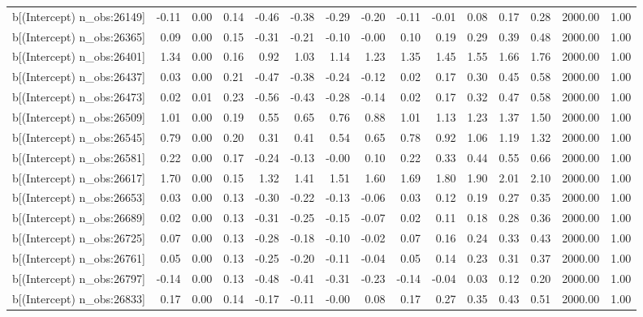 \begin{table}[ht]
\begin{tabular}{rrrrrrrrrrrrrrr}
  b[(Intercept) n\_obs:26149] & -0.11 & 0.00 & 0.14 & -0.46 & -0.38 & -0.29 & -0.20 & -0.11 & -0.01 & 0.08 & 0.17 & 0.28 & 2000.00 & 1.00 \\ 
  b[(Intercept) n\_obs:26365] & 0.09 & 0.00 & 0.15 & -0.31 & -0.21 & -0.10 & -0.00 & 0.10 & 0.19 & 0.29 & 0.39 & 0.48 & 2000.00 & 1.00 \\ 
  b[(Intercept) n\_obs:26401] & 1.34 & 0.00 & 0.16 & 0.92 & 1.03 & 1.14 & 1.23 & 1.35 & 1.45 & 1.55 & 1.66 & 1.76 & 2000.00 & 1.00 \\ 
  b[(Intercept) n\_obs:26437] & 0.03 & 0.00 & 0.21 & -0.47 & -0.38 & -0.24 & -0.12 & 0.02 & 0.17 & 0.30 & 0.45 & 0.58 & 2000.00 & 1.00 \\ 
  b[(Intercept) n\_obs:26473] & 0.02 & 0.01 & 0.23 & -0.56 & -0.43 & -0.28 & -0.14 & 0.02 & 0.17 & 0.32 & 0.47 & 0.58 & 2000.00 & 1.00 \\ 
  b[(Intercept) n\_obs:26509] & 1.01 & 0.00 & 0.19 & 0.55 & 0.65 & 0.76 & 0.88 & 1.01 & 1.13 & 1.23 & 1.37 & 1.50 & 2000.00 & 1.00 \\ 
  b[(Intercept) n\_obs:26545] & 0.79 & 0.00 & 0.20 & 0.31 & 0.41 & 0.54 & 0.65 & 0.78 & 0.92 & 1.06 & 1.19 & 1.32 & 2000.00 & 1.00 \\ 
  b[(Intercept) n\_obs:26581] & 0.22 & 0.00 & 0.17 & -0.24 & -0.13 & -0.00 & 0.10 & 0.22 & 0.33 & 0.44 & 0.55 & 0.66 & 2000.00 & 1.00 \\ 
  b[(Intercept) n\_obs:26617] & 1.70 & 0.00 & 0.15 & 1.32 & 1.41 & 1.51 & 1.60 & 1.69 & 1.80 & 1.90 & 2.01 & 2.10 & 2000.00 & 1.00 \\ 
  b[(Intercept) n\_obs:26653] & 0.03 & 0.00 & 0.13 & -0.30 & -0.22 & -0.13 & -0.06 & 0.03 & 0.12 & 0.19 & 0.27 & 0.35 & 2000.00 & 1.00 \\ 
  b[(Intercept) n\_obs:26689] & 0.02 & 0.00 & 0.13 & -0.31 & -0.25 & -0.15 & -0.07 & 0.02 & 0.11 & 0.18 & 0.28 & 0.36 & 2000.00 & 1.00 \\ 
  b[(Intercept) n\_obs:26725] & 0.07 & 0.00 & 0.13 & -0.28 & -0.18 & -0.10 & -0.02 & 0.07 & 0.16 & 0.24 & 0.33 & 0.43 & 2000.00 & 1.00 \\ 
  b[(Intercept) n\_obs:26761] & 0.05 & 0.00 & 0.13 & -0.25 & -0.20 & -0.11 & -0.04 & 0.05 & 0.14 & 0.23 & 0.31 & 0.37 & 2000.00 & 1.00 \\ 
  b[(Intercept) n\_obs:26797] & -0.14 & 0.00 & 0.13 & -0.48 & -0.41 & -0.31 & -0.23 & -0.14 & -0.04 & 0.03 & 0.12 & 0.20 & 2000.00 & 1.00 \\ 
  b[(Intercept) n\_obs:26833] & 0.17 & 0.00 & 0.14 & -0.17 & -0.11 & -0.00 & 0.08 & 0.17 & 0.27 & 0.35 & 0.43 & 0.51 & 2000.00 & 1.00 \\ 

\end{tabular}
\end{table}
